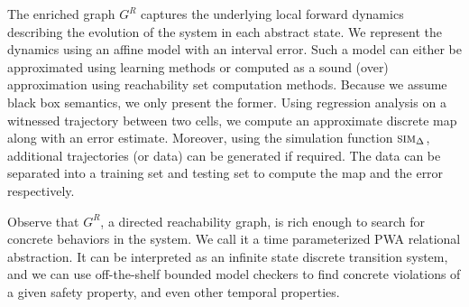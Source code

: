 The enriched graph $G^R$ captures the underlying local forward
dynamics describing the evolution of the system in each abstract
state. We represent the dynamics using an affine model with an
interval error. Such a model can either be approximated using learning
methods or computed as a sound (over) approximation using reachability
set computation methods. Because we assume black box semantics, we
only present the former. Using regression analysis on a witnessed
trajectory between two cells, we compute an approximate discrete map
along with an error estimate.  Moreover, using the simulation function
$\mbox{\sc sim}_\Delta$, additional trajectories (or data) can be generated if
required. The data can be separated into a training set and testing
set to compute the map and the error respectively.


Observe that $G^R$, a directed reachability graph, is rich enough to
search for concrete behaviors in the system. We call it a time
parameterized PWA relational abstraction. It can be interpreted as an
infinite state discrete transition system, and we can use
off-the-shelf bounded model checkers to find concrete violations of a
given safety property, and even other temporal properties.


